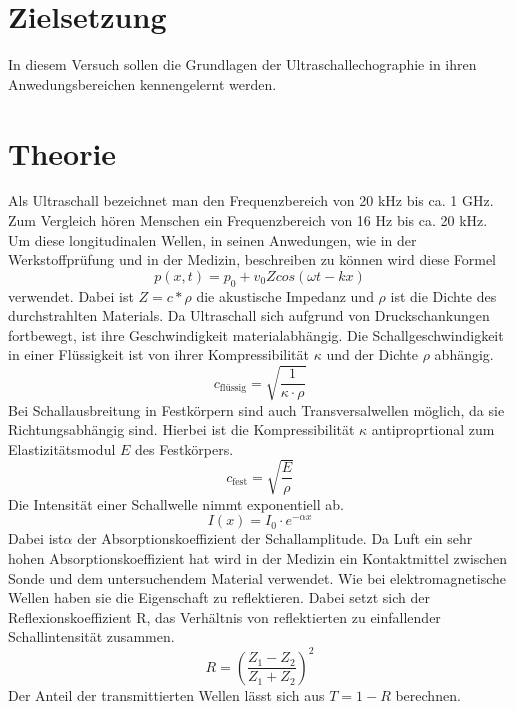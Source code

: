 \section{Zielsetzung}
In diesem Versuch sollen die Grundlagen der Ultraschallechographie
in ihren Anwedungsbereichen kennengelernt werden.
\section{Theorie}
Als Ultraschall bezeichnet man den Frequenzbereich von 20 kHz bis ca. 1 GHz.
Zum Vergleich hören Menschen ein Frequenzbereich von 16 Hz bis ca. 20 kHz.
Um diese longitudinalen Wellen, in seinen Anwedungen, wie in der Werkstoffprüfung
und in der Medizin, beschreiben zu können wird diese Formel
\begin{equation*}
  p(x,t)= p_0 + v_0 Z cos(\omega t - k x)
\end{equation*}
verwendet.
Dabei ist $Z = c* \rho$ die akustische Impedanz und $\rho$ ist die Dichte des durchstrahlten Materials.
Da Ultraschall sich aufgrund von Druckschankungen fortbewegt, ist ihre Geschwindigkeit materialabhängig.
Die Schallgeschwindigkeit in einer Flüssigkeit ist von ihrer Kompressibilität $\kappa$ und der Dichte $\rho$
abhängig.
\begin{equation*}
  c_{\text{flüssig}} = \sqrt{\frac{1}{\kappa \cdot \rho}}
\end{equation*}
Bei Schallausbreitung in Festkörpern sind auch Transversalwellen möglich, da sie Richtungsabhängig sind.
Hierbei ist die Kompressibilität $\kappa$ antiproprtional zum Elastizitätsmodul $E$ des Festkörpers.
\begin{equation*}
  c_{\text{fest}} = \sqrt{\frac{E}{\rho}}
\end{equation*}
Die Intensität einer Schallwelle nimmt exponentiell ab.
\begin{equation}
  I(x) =I_0 \cdot e^{-\alpha x}
  \label{eq:4}
\end{equation}
Dabei  ist$\alpha$ der Absorptionskoeffizient der Schallamplitude.
Da Luft ein sehr hohen Absorptionskoeffizient hat wird in der Medizin ein Kontaktmittel
zwischen Sonde und dem untersuchendem Material verwendet.
Wie bei elektromagnetische Wellen haben sie die Eigenschaft zu reflektieren.
Dabei setzt sich der Reflexionskoeffizient R, das Verhältnis von reflektierten zu einfallender Schallintensität zusammen.
\begin{equation*}
  R = \left(\frac{Z_1 - Z_2} {Z_1 + Z_2}\right)^2
\end{equation*}
Der Anteil der transmittierten Wellen lässt sich aus $T=1-R$ berechnen.
